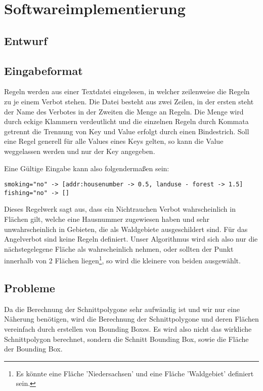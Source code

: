 \section{Softwareimplementierung}
\subsection{Entwurf}


\subsection{Eingabeformat}
Regeln werden aus einer Textdatei eingelesen, in welcher zeilenweise die Regeln zu je einem Verbot stehen.
Die Datei besteht aus zwei Zeilen, in der ersten steht der Name des Verbotes in der Zweiten die Menge an Regeln.
Die Menge wird durch eckige Klammern verdeutlicht und die einzelnen Regeln durch Kommata getrennt die Trennung von Key und Value erfolgt durch einen Bindestrich.
Soll eine Regel generell für alle Values eines Keys gelten, so kann die Value weggelassen werden und nur der Key angegeben.

Eine Gültige Eingabe kann also folgendermaßen sein:
\begin{lstlisting}[frame=single]
smoking="no" -> [addr:housenumber -> 0.5, landuse - forest -> 1.5]
fishing="no" -> []
\end{lstlisting}
Dieses Regelwerk sagt aus, dass ein Nichtrauchen Verbot wahrscheinlich in Flächen gilt, welche eine Hausnummer zugewiesen haben
und sehr unwahrscheinlich in Gebieten, die als Waldgebiete ausgeschildert sind.
Für das Angelverbot sind keine Regeln definiert. Unser Algorithmus wird sich also nur die nächstegelegene Fläche als wahrscheinlich nehmen,
oder sollten der Punkt innerhalb von 2 Flächen liegen\footnote{Es könnte eine Fläche 'Niedersachsen' und eine Fläche 'Waldgebiet' definiert sein.},
so wird die kleinere von beiden ausgewählt.

\subsection{Probleme}
Da die Berechnung der Schnittpolygone sehr aufwändig ist und wir nur eine Näherung benötigen,
wird die Berechnung der Schnittpolygone und deren Flächen vereinfach durch erstellen von Bounding Boxes.
Es wird also nicht das wirkliche Schnittpolygon berechnet, sondern die Schnitt Bounding Box, sowie die Fläche der Bounding Box.
